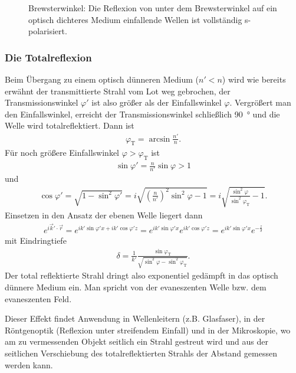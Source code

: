 \begin{figure}[htb]
    \centering
    \tfigBrewsterAngle
    \caption{Brewsterwinkel: Die Reflexion von unter dem Brewsterwinkel auf ein optisch dichteres Medium einfallende Wellen ist vollständig s-polarisiert. }
    \label{fig:brewsterwinkel}
\end{figure}

\subsubsection{Die Totalreflexion}

Beim Übergang zu einem optisch dünneren Medium ($n'<n$) wird wie bereits erwähnt der transmittierte Strahl vom Lot weg gebrochen, der Transmissionswinkel $\varphi'$ ist also größer als der Einfallswinkel $\varphi$.
Vergrößert man den Einfallswinkel, erreicht der Transmissionswinkel schließlich \SI{90}{\degree} und die Welle wird totalreflektiert.
Dann ist
\begin{align}
    \label{eq:totalreflexion}
    \varphi_\mathrm{T} = \arcsin\frac{n'}{n}.
\end{align}
Für noch größere Einfallswinkel $\varphi>\varphi_\mathrm{T}$ ist
\begin{align*}
    \sin\varphi'=\frac{n}{n'}\sin\varphi>1
\end{align*}
und
\begin{align*}
    \cos\varphi'=\sqrt{1-\sin^2\varphi'}=i\sqrt{\left(\frac{n}{n'}\right)^2\sin^2\varphi-1}=i\sqrt{\frac{\sin^2\varphi}{\sin^2\varphi_\mathrm{T}}-1}.
\end{align*}
Einsetzen in den Ansatz der ebenen Welle liegert dann
\begin{align*}
    e^{i\vec k'\cdot \vec r} = e^{ik' \sin\varphi' x+ik'\cos\varphi' z}  = e^{ik' \sin\varphi' x}e^{ik'\cos\varphi' z} = e^{ik' \sin\varphi' x}e^{-\frac{z}{\delta}}
\end{align*}
mit Eindringtiefe
\begin{align*}
    \delta=\frac{1}{k'} \frac{\sin\varphi_\mathrm{T}}{\sqrt{\sin^2\varphi-\sin^2\varphi_\mathrm{T}}}.
\end{align*}
Der total reflektierte Strahl dringt also exponentiel gedämpft in das optisch dünnere Medium ein. Man spricht von der evaneszenten Welle bzw. dem evaneszenten Feld.

Dieser Effekt findet Anwendung in Wellenleitern (z.B. Glasfaser), in der Röntgenoptik (Reflexion unter streifendem Einfall) und in der Mikroskopie,
wo am zu vermessenden Objekt seitlich ein Strahl gestreut wird und aus der seitlichen Verschiebung des totalreflektierten Strahls der Abstand gemessen werden kann.




